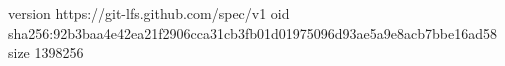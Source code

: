 version https://git-lfs.github.com/spec/v1
oid sha256:92b3baa4e42ea21f2906cca31cb3fb01d01975096d93ae5a9e8acb7bbe16ad58
size 1398256
